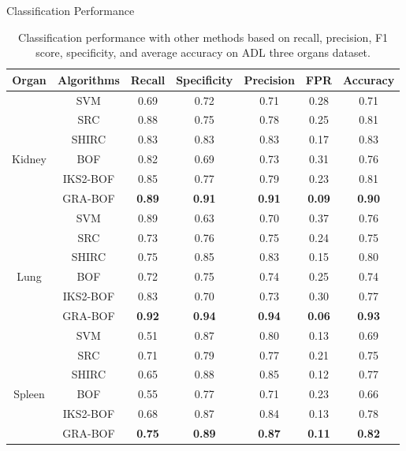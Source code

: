 \documentclass [9pt,times] {beamer}
\begin{document}
\begin{frame}{Classification Performance}

\begin{table}
\centering
\scriptsize
\caption{Classification performance  with  other methods based on  recall, precision, F1 score, specificity, and average accuracy on ADL three organs dataset.}
    \label{tab:cm}
\renewcommand{\arraystretch}{1.2} 

\begin{tabular}{|c|c|c|c|c|c|c|}
\hline
    Organ &    Algorithms    &    Recall    &Specificity    &Precision    &    FPR    &    Accuracy    \\
\hline
    &    SVM    &    0.69    &    0.72    &    0.71    &    0.28    &    0.71    \\
    &    SRC    &    0.88    &    0.75    &    0.78    &    0.25    &    0.81    \\
    &    SHIRC    &    0.83    &    0.83    &    0.83    &    0.17    &    0.83    \\
Kidney    &    BOF    &    0.82    &    0.69    &    0.73    &    0.31    &    0.76    \\
    &    IKS2-BOF    &    0.85    &    0.77    &    0.79    &    0.23    &    0.81    \\
    &    GRA-BOF    &\textbf{    0.89    }&\textbf{    0.91    }&\textbf{    0.91    }&\textbf{    0.09    }&\textbf{    0.90    }\\
\hline    
&    SVM    &    0.89    &    0.63    &    0.70    &    0.37    &    0.76    \\
    &    SRC    &    0.73    &    0.76    &    0.75    &    0.24    &    0.75    \\
    &    SHIRC    &    0.75    &    0.85    &    0.83    &    0.15    &    0.80    \\
Lung    &    BOF    &    0.72    &    0.75    &    0.74    &    0.25    &    0.74    \\
    &    IKS2-BOF    &    0.83    &    0.70    &    0.73    &    0.30    &    0.77    \\
    &    GRA-BOF    &\textbf{    0.92    }&\textbf{    0.94    }&\textbf{    0.94    }&\textbf{    0.06    }&\textbf{    0.93    }\\
\hline    
&    SVM    &    0.51    &    0.87    &    0.80    &    0.13    &    0.69    \\
    &    SRC    &    0.71    &    0.79    &    0.77    &    0.21    &    0.75    \\
    &    SHIRC    &    0.65    &    0.88    &    0.85    &    0.12    &    0.77    \\
Spleen    &    BOF    &    0.55    &    0.77    &    0.71    &    0.23    &    0.66    \\
    &    IKS2-BOF    &    0.68    &    0.87    &    0.84    &    0.13    &    0.78    \\
    &    GRA-BOF    &\textbf{    0.75    }&\textbf{    0.89    }&\textbf{    0.87    }&\textbf{    0.11    }&\textbf{    0.82    }\\
\hline
\end{tabular}
\end{table}

\end{frame}
\end{document}
